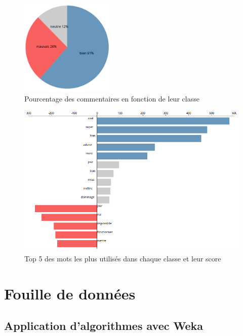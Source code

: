 \documentclass[a4paper, 11pt]{article}
\begin{document}
\begin{figure}[h]
\begin{center}
\includegraphics[width=0.4\textwidth]{visu1.png}
\end{center}
\caption{Pourcentage des commentaires en fonction de leur classe}\label{camembert}
\end{figure}

\begin{figure}[h]
\begin{center}
\includegraphics[width=\textwidth]{visu2.png}
\end{center}
\caption{Top 5 des mots les plus utilisés dans chaque classe et leur score}\label{histogramme}
\end{figure}
\clearpage

\section{Fouille de données}\label{fouille}

\subsection{Application d'algorithmes avec Weka}
\end{document}
